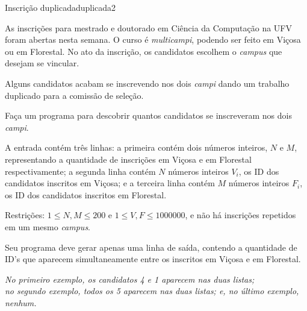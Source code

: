 \documentclass[12pt,a4paper,oneside]{article}
\begin{document}
\begin{problem}{Inscrição duplicada}{duplicada}{2}

As inscrições para mestrado e doutorado em Ciência da Computação na UFV foram abertas nesta semana.
O curso é \textit{multicampi}, podendo ser feito em Viçosa ou em Florestal.
No ato da inscrição, os candidatos escolhem o \textit{campus} que desejam se vincular.

Alguns candidatos acabam se inscrevendo nos dois \textit{campi} dando um trabalho duplicado para a comissão de seleção.

Faça um programa para descobrir quantos candidatos se inscreveram nos dois \textit{campi}.

%

\InputFile

A entrada contém três linhas:
a primeira contém dois números inteiros, $N$ e $M$, representando a quantidade de inscrições em Viçosa e em Florestal respectivamente;
a segunda linha contém $N$ números inteiros $V_i$, os ID dos candidatos inscritos em Viçosa;
e a terceira linha contém $M$ números inteiros $F_i$, os ID dos candidatos inscritos em Florestal.

Restrições: $1 \leq N, M \leq 200$ e $1 \leq V, F \leq 1000000$,
e não há inscrições repetidos em um mesmo \textit{campus}.

\OutputFile

Seu programa deve gerar apenas uma linha de saída, contendo a quantidade de ID's que aparecem simultaneamente entre os inscritos em Viçosa e em Florestal.


\Example

\begin{example}
%
\end{example}

\begin{example}
%
\end{example}

\begin{example}
%
\end{example}

\small
{\textit {No primeiro exemplo, os candidatos 4 e 1 aparecem nas duas listas;\\
no segundo exemplo, todos os 5 aparecem nas duas listas; e, no último exemplo, nenhum.}}

\end{problem}
\end{document}

